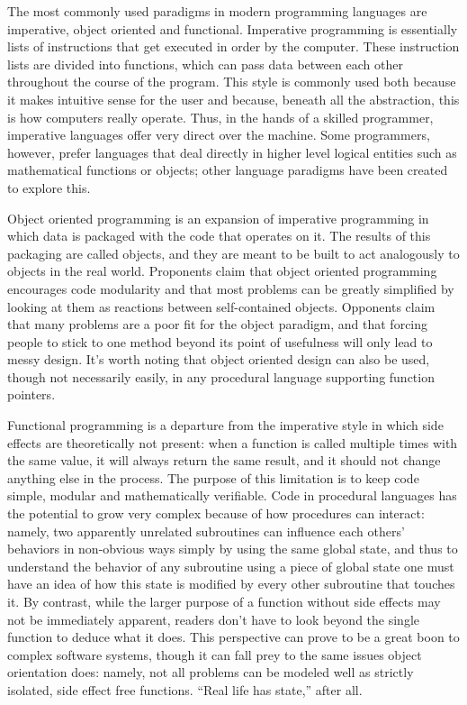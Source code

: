 \documentclass[12pt]{report}
\begin{document}
The most commonly used paradigms in modern programming languages are
imperative, object oriented and functional. Imperative programming is
essentially lists of instructions that get executed in order by the
computer.  These instruction lists are divided into functions, which
can pass data between each other throughout the course of the
program. This style is commonly used both because it makes intuitive
sense for the user\footnotemark{} and because, beneath all the
abstraction, this is how computers really operate. Thus, in the hands
of a skilled programmer, imperative languages offer very direct over
the machine. Some programmers, however, prefer languages that deal
directly in higher level logical entities such as mathematical
functions or objects; other language paradigms have been created to
explore this.


Object oriented programming is an expansion of imperative programming
in which data is packaged with the code that operates on it. The
results of this packaging are called objects, and they are meant to be
built to act analogously to objects in the real world. Proponents
claim that object oriented programming encourages code modularity and
that most problems can be greatly simplified by looking at them as
reactions between self-contained objects.  Opponents claim that many
problems are a poor fit for the object paradigm, and that forcing
people to stick to one method beyond its point of usefulness will only
lead to messy design. It's worth noting that object oriented design
can also be used, though not necessarily easily, in any procedural
language supporting function pointers.

Functional programming is a departure from the imperative style in
which side effects are theoretically not present: when a function is
called multiple times with the same value, it will always return the
same result, and it should not change anything else in the
process. The purpose of this limitation is to keep code simple,
modular and mathematically verifiable. Code in procedural languages
has the potential to grow very complex because of how procedures can
interact: namely, two apparently unrelated subroutines can influence
each others' behaviors in non-obvious ways simply by using the same
global state, and thus to understand the behavior of any subroutine
using a piece of global state one must have an idea of how this state
is modified by every other subroutine that touches it. By contrast,
while the larger purpose of a function without side effects may not be
immediately apparent, readers don't have to look beyond the single
function to deduce what it does. This perspective can prove to be a
great boon to complex software systems, though it can fall prey to the
same issues object orientation does: namely, not all problems can be
modeled well as strictly isolated, side effect free functions. ``Real
life has state,'' after all.
\end{document}
